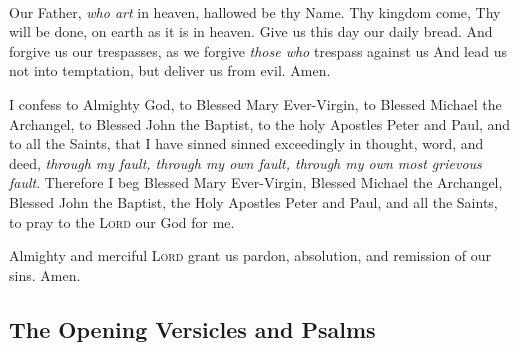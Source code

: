 \documentclass{article}
\begin{document}
\\
%
\begin{prayer}
  Our Father, \textit{who art} in heaven,
    hallowed be thy Name.
    Thy kingdom come,
    Thy will be done,
      on earth as it is in heaven.
  Give us this day our daily bread.
  And forgive us our trespasses,
    as we forgive \textit{those who} trespass against us
  And lead us not into temptation,
    but deliver us from evil. Amen.
    
\end{prayer}



\begin{prayer}

  I confess to Almighty God,
    to Blessed Mary Ever-Virgin,
    to Blessed Michael the Archangel,
    to Blessed John the Baptist,
    to the holy Apostles Peter and Paul,
    and to all the Saints,
  that I have sinned sinned exceedingly
    in thought, word, and deed,
  \textit{through my fault, through my own fault,
    through my own most grievous fault}.
  Therefore I beg Blessed Mary Ever-Virgin,
    Blessed Michael the Archangel,
    Blessed John the Baptist,
    the Holy Apostles Peter and Paul,
    and all the Saints,
    to pray to the \textsc{Lord} our God for me.
    
\end{prayer}


Almighty and merciful \textsc{Lord} grant us pardon, \cross absolution, and remission of our sins. Amen.

\begin{responses}

    
\end{responses}

\subsection*{The Opening Versicles and Psalms}

\begin{responses}

    
\end{responses}
\end{document}
